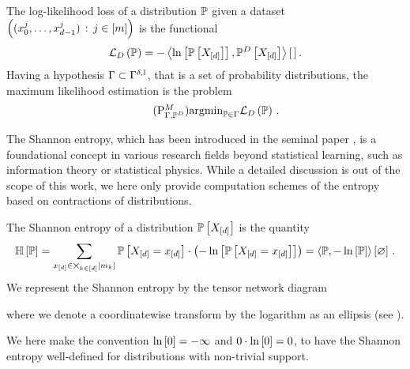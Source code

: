 \begin{definition}
    \label{def:loss}
    The log-likelihood loss of a distribution $\mathbb{P}$ given a dataset $\left(({x_{0}^{j},\ldots,x_{d-1}^{j}})\,:\,j\in[m]\right)$ is the functional
    \begin{align*}
        \mathcal{L}_{D}\left(\mathbb{P}\right)
        = -\left\langle \ln \left[ \mathbb{P}\left[X_{[d]}\right] \right],\mathbb{P}^{D}\left[X_{[d]}\right]\right\rangle \left[ \, \right] .
    \end{align*}
    Having a hypothesis $\Gamma\subset\Gamma^{\delta,\mathbb{I}}$, that is a set of probability distributions, the maximum likelihood estimation is the problem
    \begin{align}
        \tag{$\probtagtypeinst{M}{\Gamma,\empdistribution}$}\label{prob:parameterMaxLikelihood}
        \argmin_{\probtensorin} \lossof{\probtensor} \, .
    \end{align}
\end{definition}



The Shannon entropy, which has been introduced in the seminal paper \cite{shannon_mathematical_1948}, is a foundational concept in various research fields beyond statistical learning, such as information theory or statistical physics.
While a detailed discussion is out of the scope of this work, we here only provide computation schemes of the entropy based on contractions of distributions.

\begin{definition}
    The Shannon entropy of a distribution $\mathbb{P}\left[X_{[d]}\right]$ is the quantity
    \begin{align*}
        \mathbb{H}\left[\mathbb{P}\right]
        =  \sum_{x_{[d]}\in\bigtimes_{k\in[d]}[m_{k}]} \mathbb{P}\left[X_{[d]}=x_{[d]}\right] \cdot \left(-\ln \left[ \mathbb{P}\left[X_{[d]}=x_{[d]}\right] \right]\right)
        = \left\langle \mathbb{P},-\ln \left[ \mathbb{P} \right]\right\rangle \left[ \varnothing \right] \, .
    \end{align*}
    We represent the Shannon entropy by the tensor network diagram
    \begin{center}
        
    \end{center}
    where we denote a coordinatewise transform by the logarithm as an ellipsis (see ).
\end{definition}

We here make the convention $\ln \left[ 0 \right]=-\infty$ and $0\cdot\ln \left[ 0 \right] = 0$, to have the Shannon entropy well-defined for distributions with non-trivial support.

